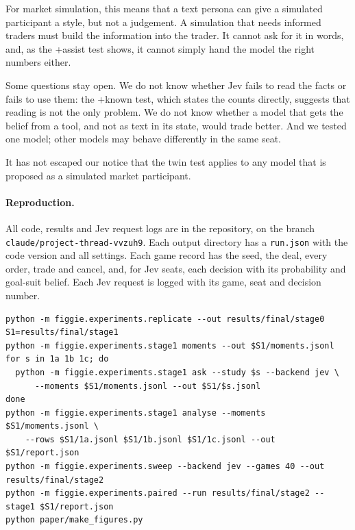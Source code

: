\documentclass[10pt]{article}
\begin{document}
For market simulation, this means that a text persona can give a simulated participant a style, but not a
judgement. A simulation that needs informed traders must build the information into the trader. It cannot ask for it
in words, and, as the +assist test shows, it cannot simply hand the model the right numbers either.

Some questions stay open. We do not know whether Jev fails to read the facts or fails to use them: the +known test,
which states the counts directly, suggests that reading is not the only problem. We do not know whether a model that
gets the belief from a tool, and not as text in its state, would trade better. And we tested one model; other models
may behave differently in the same seat.

It has not escaped our notice that the twin test applies to any model that is proposed as a simulated market
participant.

\paragraph{Reproduction.} All code, results and Jev request logs are in the repository, on the branch
\nolinkurl{claude/project-thread-vvzuh9}. Each output directory has a \texttt{run.json} with the code version and all
settings. Each game record has the seed, the deal, every order, trade and cancel, and, for Jev seats, each decision
with its probability and goal-suit belief. Each Jev request is logged with its game, seat and decision number.
{\small
\begin{verbatim}
python -m figgie.experiments.replicate --out results/final/stage0
S1=results/final/stage1
python -m figgie.experiments.stage1 moments --out $S1/moments.jsonl
for s in 1a 1b 1c; do
  python -m figgie.experiments.stage1 ask --study $s --backend jev \
      --moments $S1/moments.jsonl --out $S1/$s.jsonl
done
python -m figgie.experiments.stage1 analyse --moments $S1/moments.jsonl \
    --rows $S1/1a.jsonl $S1/1b.jsonl $S1/1c.jsonl --out $S1/report.json
python -m figgie.experiments.sweep --backend jev --games 40 --out results/final/stage2
python -m figgie.experiments.paired --run results/final/stage2 --stage1 $S1/report.json
python paper/make_figures.py
\end{verbatim}
}
\end{document}
